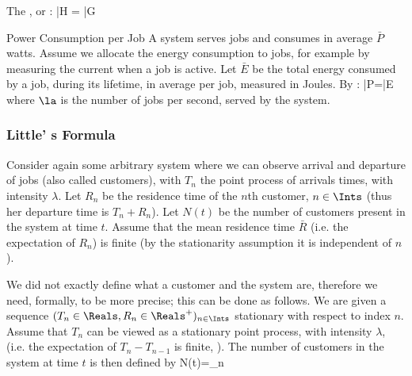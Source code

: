 \begin{sh}
The , or : \be
 \bar{H} = \la \bar{G}
 \label{eq-HlaG}
\ee
\end{sh}
%

\begin{ex}{Power Consumption per Job}
A system serves jobs and consumes in average
$\bar{P}$ watts. Assume we allocate the energy
consumption to jobs, for example by measuring the
current when a job is active. Let $\bar{E}$ be
the total energy consumed by a job, during its
lifetime, in average per job, measured in Joules.
By : \ben \bar{P}=\la \bar{E}\een
where $\la$ is the number of jobs per second,
served by the system.
\end{ex}

\subsubsection{Little' s Formula}
Consider again some arbitrary system where we can
observe arrival and departure of jobs (also
called customers), with $T_n$ the point process
of arrivals times, with intensity $\lambda$. Let
$R_n$ be the residence time of the $n$th
customer, $n \in \Ints$ (thus her departure time
is $T_n+R_n$). Let $N(t)$ be the number of
customers present in the system at time $t$.
Assume that the mean residence time $\bar{R}$
(i.e. the expectation of $R_n$) is finite (by the
stationarity assumption it is independent of
$n$).

\begin{petit}
We did not exactly define what a customer and the system are,
therefore we need, formally, to be more precise; this can be
done as follows. We are given a sequence $(T_n\in \Reals,
R_n\in \Reals^+)_{n\in \Ints}$ stationary with respect to index
$n$. Assume that $T_n$ can be viewed as a stationary point
process, with intensity $\lambda$, (i.e. the expectation of
$T_n-T_{n-1}$ is finite, ). The number
of customers in the system at time $t$ is then defined by
 \ben
 N(t)=\sum_{n \in \Ints}
 \een
\end{petit}

